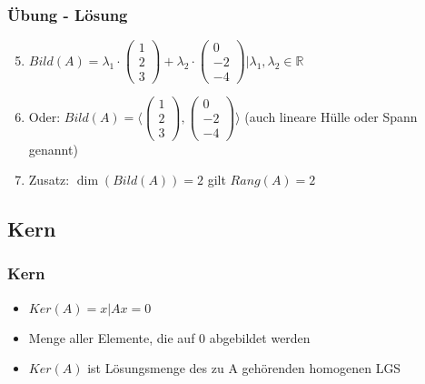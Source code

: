 \begin{frame}
    \frametitle{Übung - Lösung}
    \begin{enumerate}
		\setcounter{enumi}{4}
        \item
		$Bild(A) = {
		\lambda_1 \cdot
		\begin{pmatrix}
			1 \\
			2 \\
			3
		\end{pmatrix}
		+
		\lambda_2 \cdot
		\begin{pmatrix}
			0 \\
			-2 \\
			-4
		\end{pmatrix}
		| \lambda_1, \lambda_2 \in \mathbb{R}
		}$
		\item Oder: $Bild(A) = \Biggl\langle \begin{pmatrix}1 \\ 2 \\ 3\end{pmatrix}, \begin{pmatrix}0 \\ -2 \\ -4\end{pmatrix} \Biggr\rangle$ (auch lineare Hülle oder Spann genannt)
		\item Zusatz: $\dim(Bild(A)) = 2$ gilt $Rang(A)=2$
    \end{enumerate}
\end{frame}

\subsection{Kern}
\begin{frame}
    \frametitle{Kern}
    \begin{itemize}
        \item $Ker(A)={x | Ax=0}$
        \item Menge aller Elemente, die auf 0 abgebildet werden
        \item $Ker(A)$ ist Lösungsmenge des zu A gehörenden homogenen LGS
    \end{itemize}
\end{frame}

